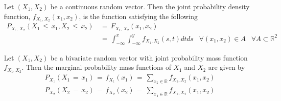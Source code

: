 \begin{definition}
    Let $(X_{1}, X_{2})$ be a continuous random vector. Then the joint probability density function, $f_{X_{1}, X_{2}}(x_{1}, x_{2})$, is the function satisfying the following
    \begin{align*}
        P_{X_{1}, X_{2}}(X_{1} \hspace{2pt} \leq \hspace{2pt} x_{1}, X_{2} \hspace{2pt} \leq \hspace{2pt} x_{2}) \hspace{2pt} &= \hspace{2pt} F_{X_{1}, X_{2}}(x_{1}, x_{2}) \\[1ex]
        &= \hspace{2pt} \int_{-\infty}^{x}\int_{-\infty}^{y} f_{X_{1}, X_{2}}(s,t) dt ds \hspace{10pt} \forall (x_{1}, x_{2}) \in A \hspace{10pt} \forall A \subset \mathbb{R}^{2}
    \end{align*}
\end{definition}

\begin{theorem}
    Let $(X_{1}, X_{2})$ be a bivariate random vector with joint probability mass function $f_{X_{1}, X_{2}}$. Then the marginal probability mass functions of $X_{1}$ and $X_{2}$ are given by
    \begin{align*}
        &P_{X_{1}}(X_{1} \hspace{2pt} = \hspace{2pt} x_{1}) \hspace{2pt} = \hspace{2pt} f_{X_{1}}(x_{1}) \hspace{2pt} = \hspace{2pt} \sum_{x_{2} \in \mathbb{R}} f_{X_{1}, X_{2}}(x_{1}, x_{2}) \\[1ex]
        &P_{X_{2}}(X_{2} \hspace{2pt} = \hspace{2pt} x_{2}) \hspace{2pt} = \hspace{2pt} f_{X_{2}}(x_{2}) \hspace{2pt} = \hspace{2pt} \sum_{x_{1} \in \mathbb{R}} f_{X_{1}, X_{2}}(x_{1}, x_{2})
    \end{align*}
\end{theorem}


